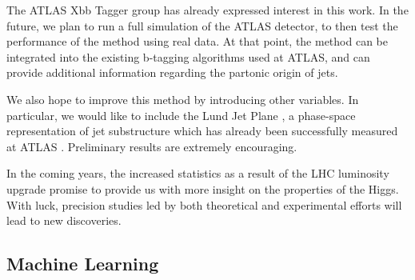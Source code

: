 \documentclass[10pt,a4paper]{book}
\begin{document}
The ATLAS Xbb Tagger group has already expressed interest in this work. In the future, we plan to run a full simulation of the ATLAS detector, to then test the performance of the method using real data. At that point, the method can be integrated into the existing b-tagging algorithms used at ATLAS, and can provide additional information regarding the partonic origin of jets.

We also hope to improve this method by introducing other variables. In particular, we would like to include the Lund Jet Plane \cite{Dreyer:2018nbf}, a phase-space representation of jet substructure which has already been successfully measured at ATLAS \cite{ATLAS:2020bbn}. Preliminary results are extremely encouraging. 

In the coming years, the increased statistics as a result of the LHC luminosity upgrade promise to provide us with more insight on the properties of the Higgs. With luck, precision studies led by both theoretical and experimental efforts will lead to new discoveries.


\begin{appendices}
\chapter{Machine Learning}
\label{Appendix}

\end{appendices}



\end{document}
